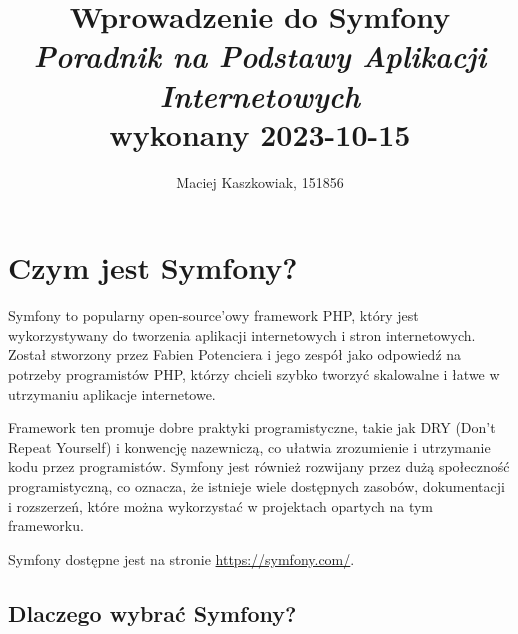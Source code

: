 \documentclass[polish, a4paper]{article}
\title{Wprowadzenie do Symfony \\
        \Large \emph{Poradnik na Podstawy Aplikacji Internetowych} \\
        wykonany 2023-10-15}
\author{Maciej Kaszkowiak, 151856}
\date{\vspace{-5ex}} %
\begin{document}
\maketitle

\tableofcontents

\newpage

\section{Czym jest Symfony?}

Symfony to popularny open-source'owy framework PHP, który jest wykorzystywany do tworzenia aplikacji internetowych i stron internetowych. Został stworzony przez Fabien Potenciera i jego zespół jako odpowiedź na potrzeby programistów PHP, którzy chcieli szybko tworzyć skalowalne i łatwe w utrzymaniu aplikacje internetowe.

Framework ten promuje dobre praktyki programistyczne, takie jak DRY (Don't Repeat Yourself) i konwencję nazewniczą, co ułatwia zrozumienie i utrzymanie kodu przez programistów. Symfony jest również rozwijany przez dużą społeczność programistyczną, co oznacza, że istnieje wiele dostępnych zasobów, dokumentacji i rozszerzeń, które można wykorzystać w projektach opartych na tym frameworku.

Symfony dostępne jest na stronie \href{https://symfony.com/}{https://symfony.com/}.

\subsection{Dlaczego wybrać Symfony?}
\end{document}
